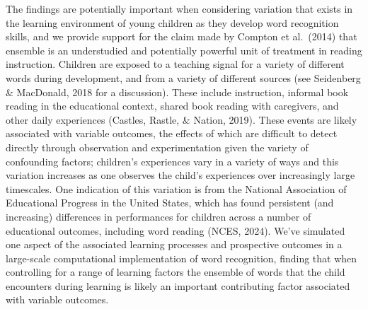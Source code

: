 \documentclass[
  ,man,floatsintext]{apa6}
\begin{document}
The findings are potentially important when considering variation that exists in the learning environment of young children as they develop word recognition skills, and we provide support for the claim made by Compton et al.~(2014) that ensemble is an understudied and potentially powerful unit of treatment in reading instruction. Children are exposed to a teaching signal for a variety of different words during development, and from a variety of different sources (see Seidenberg \& MacDonald, 2018 for a discussion). These include instruction, informal book reading in the educational context, shared book reading with caregivers, and other daily experiences (Castles, Rastle, \& Nation, 2019). These events are likely associated with variable outcomes, the effects of which are difficult to detect directly through observation and experimentation given the variety of confounding factors; children's experiences vary in a variety of ways and this variation increases as one observes the child's experiences over increasingly large timescales. One indication of this variation is from the National Association of Educational Progress in the United States, which has found persistent (and increasing) differences in performances for children across a number of educational outcomes, including word reading (NCES, 2024). We've simulated one aspect of the associated learning processes and prospective outcomes in a large-scale computational implementation of word recognition, finding that when controlling for a range of learning factors the ensemble of words that the child encounters during learning is likely an important contributing factor associated with variable outcomes.
\end{document}
